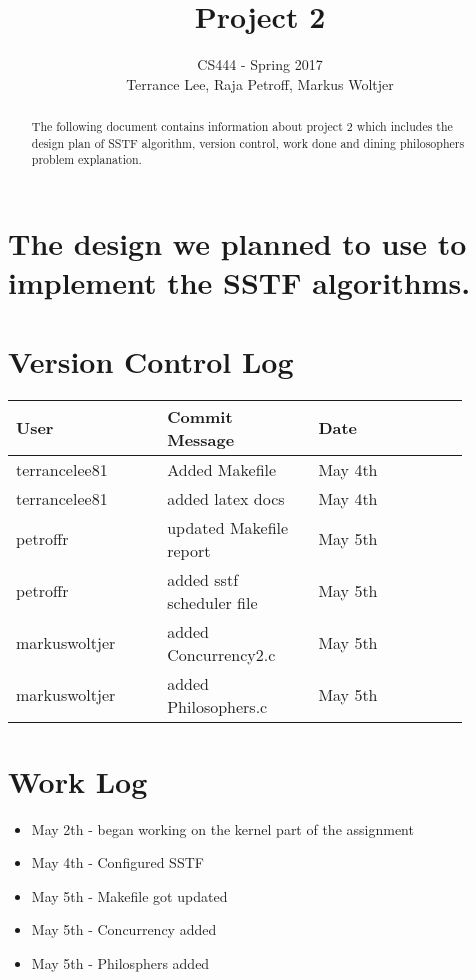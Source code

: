 \documentclass[draftclsnofoot,onecolumn,10pt,compsoc]{IEEEtran}
\begin{document}
\begin{titlepage}
	\title{Project 2}
	\author{CS444 - Spring 2017 \\ Terrance Lee, Raja Petroff, Markus Woltjer}
	\maketitle
	\begin{abstract}
		The following document contains information about project 2 which includes the design plan of SSTF algorithm, version control, work done and dining philosophers problem explanation.  
	\end{abstract}
	
	\thispagestyle{empty} %
	
\end{titlepage}

\tableofcontents

\newpage

\section{The design we planned to use to implement the SSTF algorithms.}
\section{Version Control Log}
\begin{center}
	\begin{tabular}{| p{0.3\linewidth} | p{0.3\linewidth} | p{0.3\linewidth} |}
		\hline User & Commit Message & Date\\
		\hline terrancelee81 & Added Makefile & May 4th\\
		\hline terrancelee81 & added latex docs& May 4th\\
		\hline petroffr & updated Makefile report & May 5th \\	
		\hline petroffr & added sstf scheduler file & May 5th \\ 	
		\hline markuswoltjer & added Concurrency2.c & May 5th\\
		\hline markuswoltjer & added Philosophers.c & May 5th\\	
	\end{tabular}
\end{center}
\section{Work Log}
\begin{itemize}
	\item May 2th - began working on the kernel part of the assignment
	\item May 4th - Configured SSTF
	\item May 5th - Makefile got updated
	\item May 5th -  Concurrency added
	\item May 5th - Philosphers added
	
	
\end{itemize}
\end{document}
